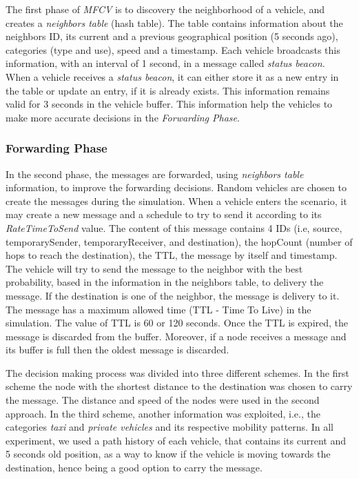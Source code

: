 \documentclass[letterpaper, 10 pt, conference]{ieeeconf}  %
\begin{document}
The first phase of \emph{MFCV} is to discovery the neighborhood of a vehicle, and creates a \emph{neighbors table} (hash table). The table contains information about the neighbors ID, its current and a previous geographical position (5 seconds ago), categories (type and use), speed and a timestamp. Each vehicle broadcasts this information, with an interval of 1 second, in a message called \emph{status beacon}. When a vehicle receives a \emph{status beacon}, it can either store it as a new entry in the table or update an entry, if it is already exists. This information remains valid for 3 seconds in the vehicle buffer. This information help the vehicles to make more accurate decisions in the \emph{Forwarding Phase}.

\subsubsection{Forwarding Phase}

In the second phase, the messages are forwarded, using \emph{neighbors table} information, to improve the forwarding decisions. Random vehicles are chosen to create the messages during the simulation. When a vehicle enters the scenario, it may create a new message and a schedule to try to send it according to its \emph{RateTimeToSend} value. The content of this message contains 4 IDs (i.e, source, temporarySender, temporaryReceiver, and destination), the hopCount (number of hops to reach the destination), the TTL, the message by itself and timestamp. The vehicle will try to send the message to the neighbor with the best probability, based in the information in the neighbors table, to delivery the message. If the destination is one of the neighbor, the message is delivery to it. The message has a maximum allowed time (TTL - Time To Live) in the simulation. The value of TTL is 60 or 120 seconds. Once the TTL is expired, the message is discarded from the buffer. Moreover, if a node receives a message and its buffer is full then the oldest message is discarded.

The decision making process was divided into three different schemes. In the first scheme the node with the shortest distance to the destination was chosen to carry the message. The distance and speed of the nodes were used in the second approach. In the third scheme, another information was exploited, i.e., the categories \emph{taxi} and \emph{private vehicles} and its respective mobility patterns. In all experiment, we used a path history of each vehicle, that contains its current and 5 seconds old position, as a way to know if the vehicle is moving towards the destination, hence being a good option to carry the message.
\end{document}
